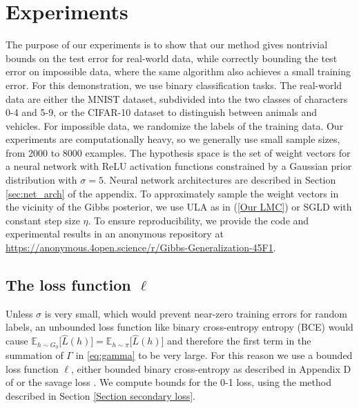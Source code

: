 \documentclass{article} %
\begin{document}
\section{Experiments}
The purpose of our experiments is to show that our method gives nontrivial bounds on the test error for real-world data, while correctly bounding the test error on impossible data, where the same algorithm also achieves a small training error. For this demonstration, we use binary classification tasks. The real-world data are either the MNIST dataset, subdivided into the two classes of characters 0-4 and 5-9, or the CIFAR-10 dataset to distinguish between animals and vehicles. For impossible data, we randomize the labels of the training data. Our experiments are computationally heavy, so we generally use small sample sizes, from 2000 to 8000 examples. The hypothesis space is the set of weight vectors for a neural network with ReLU activation functions constrained by a Gaussian prior distribution with $\sigma =5$. Neural network architectures are described in Section \ref{sec:net_arch} of the appendix. To approximately sample the weight vectors in the vicinity of the Gibbs posterior, we use ULA as in (\ref{Our LMC}) or SGLD \citep{welling2011bayesian} with constant step size $\eta $. To ensure reproducibility, we provide the code and experimental results in an anonymous repository at \url{https://anonymous.4open.science/r/Gibbs-Generalization-45F1}.

\subsection{The loss function $\ell $}

Unless $\sigma$ is very small, which would prevent near-zero training
errors for random labels, an unbounded loss function like binary cross-entropy
entropy (BCE) would cause $\mathbb{E}_{h\sim G_{0}}\big[ \hat{L}(
h)\big] =\mathbb{E}_{h\sim \pi}\big[ \hat{L}(h)\big] $ and therefore the first term in the summation of $\Gamma$ in \eqref{eq:gamma} to be very large. For this reason we use a bounded loss function $\ell $, either bounded binary
cross-entropy as described in Appendix D of \cite{dziugaite2018data} or
the savage loss \citep{masnadi2008design}. We compute bounds 
for the 0-1 loss, using the method described in Section \ref{Section
secondary loss}.
\end{document}
